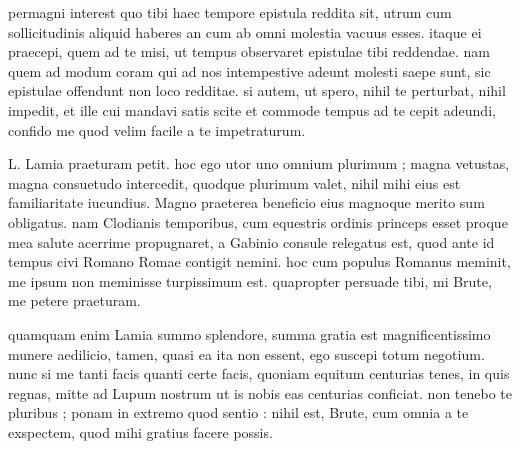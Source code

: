 


 permagni interest quo tibi haec tempore epistula reddita sit, utrum cum sollicitudinis aliquid haberes an cum ab omni molestia vacuus esses. itaque ei praecepi, quem ad te misi, ut tempus observaret epistulae tibi reddendae. nam quem ad modum coram qui ad nos intempestive adeunt molesti saepe sunt, sic epistulae offendunt non loco redditae. si autem, ut spero, nihil te perturbat, nihil impedit, et ille cui mandavi satis scite et commode tempus ad te cepit adeundi, confido me quod velim facile a te impetraturum.

 L. Lamia praeturam petit. hoc ego utor uno omnium plurimum ; magna vetustas, magna consuetudo intercedit, quodque plurimum valet, nihil mihi eius est familiaritate iucundius. Magno praeterea beneficio eius magnoque merito sum obligatus. nam Clodianis temporibus, cum equestris ordinis princeps esset proque mea salute acerrime propugnaret, a Gabinio consule relegatus est, quod ante id tempus civi Romano Romae contigit nemini. hoc cum populus Romanus meminit, me ipsum non meminisse turpissimum est. quapropter persuade tibi, mi Brute, me petere praeturam.

 quamquam enim Lamia summo splendore, summa gratia est magnificentissimo munere aedilicio, tamen, quasi ea ita non essent, ego suscepi totum negotium. nunc si me tanti facis quanti certe facis, quoniam equitum centurias tenes, in quis regnas, mitte ad Lupum nostrum ut is nobis eas centurias conficiat. non tenebo te pluribus ; ponam in extremo quod sentio : nihil est, Brute, cum omnia a te exspectem, quod mihi gratius facere possis.
